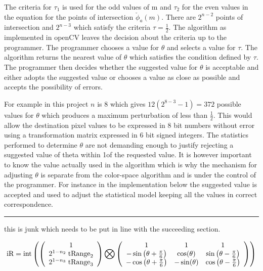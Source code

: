 The criteria for $\tau_1$ is used for the odd values of m and $\tau_2$ for the even values in the equation for the points of intersection $\check{\phi}_{a} (m)$. There are $2^{n-2}$ points of intersection and $2^{n-3}$ which satisfy the criteria $\tau = \frac{1}{2}$. The algorithm as implemented in openCV leaves the decision about the criteria up to the programmer. The programmer chooses a value for $\theta$ and selects a value for $\tau$. The algorithm returns the nearest value of $\theta$ which satisfies the condition defined by $\tau$. The programmer then decides whether the suggested value for $\theta$ is acceptable and either adopts the suggested value or chooses a value as close as possible and accepts the possibility of errors.

For example in this project $n$ is 8 which gives $12 (2^{8-3}-1) = 372$ possible values for $\theta$ which produces a maximum perturbation of less than $\frac{1}{2}$. This would allow the destination pixel values to be expressed in 8 bit numbers without error using a transformation matrix expressed in 6 bit signed integers. The statistics performed to determine $\theta$ are not demanding enough to justify rejecting a suggested value of theta within 1\textdegree of the requested value. It is however important to know the value actually used in the algorithm which is why the mechanism for adjusting $\theta$ is separate from the color-space algorithm and is under the control of the programmer. For instance in the implementation below the suggested value is accepted and used to adjust the statistical model keeping all the values in correct correspondence.

\hrule

this is junk which needs to be put in line with the succeeding section.

\begin{equation}
\text{iR} =
\text{int}\left(
\left(
\begin{array}{c}
 1 \\
 2^{1-n_2} \; \text{tRange}_2\\
 2^{1-n_3} \; \text{tRange}_3 \\
\end{array}
\right) 
\bigotimes
\left(
\begin{array}{ccc}
 1 & 1 & 1 \\
 -\sin \left(\theta +\frac{\pi}{6}\right) &  \cos (\theta ) &  \sin \left(\theta -\frac{\pi}{6}\right) \\
 -\cos \left(\theta +\frac{\pi}{6}\right) & - \sin (\theta ) & \cos \left(\theta -\frac{\pi}{6}\right) \\
\end{array}
\right)
\right)
\end{equation}

